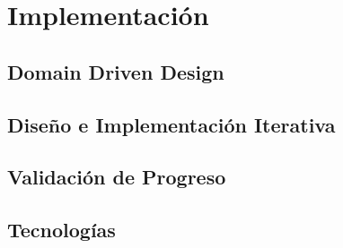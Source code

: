 \chapter{Implementación}
 
\section{Domain Driven Design}

\section{Diseño e Implementación Iterativa}

\section{Validación de Progreso}

\section{Tecnologías}